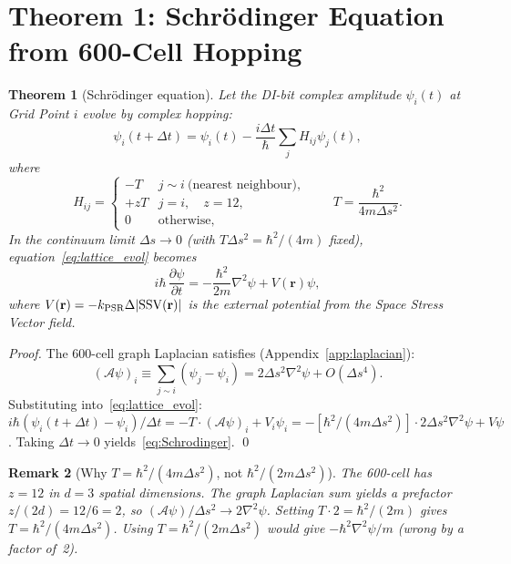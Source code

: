 \documentclass[11pt,a4paper]{article}
\newtheorem{theorem}{Theorem}[section]
\newtheorem{remark}[theorem]{Remark}
\newcommand{\SSV}{\mathrm{SSV}}
\begin{document}
\section{Theorem 1: Schr\"{o}dinger Equation from 600-Cell Hopping}

\begin{theorem}[Schr\"{o}dinger equation]
\label{thm:schrodinger}
Let the DI-bit complex amplitude $\psi_i(t)$ at Grid Point $i$ evolve
by complex hopping:
\begin{equation}
\psi_i(t+\Delta t) = \psi_i(t)
- \frac{i\Delta t}{\hbar}\sum_j H_{ij}\psi_j(t),
\label{eq:lattice_evol}
\end{equation}
where
\begin{equation}
H_{ij} = \begin{cases}
-T & j \sim i \ \text{(nearest neighbour)}, \\
+zT & j = i, \quad z = 12, \\
0 & \text{otherwise},
\end{cases}
\qquad T = \frac{\hbar^2}{4m\Delta s^2}.
\label{eq:H}
\end{equation}
In the continuum limit $\Delta s \to 0$ (with $T\Delta s^2 =
\hbar^2/(4m)$ fixed), equation~\eqref{eq:lattice_evol} becomes
\begin{equation}
i\hbar\,\frac{\partial\psi}{\partial t}
= -\frac{\hbar^2}{2m}\nabla^2\psi + V(\mathbf{r})\psi,
\label{eq:Schrodinger}
\end{equation}
where $V(\mathbf{r}) = -k_{\rm PSR}\Delta|\SSV(\mathbf{r})|$ is the
external potential from the Space Stress Vector field.
\end{theorem}

\begin{proof}
The 600-cell graph Laplacian satisfies (Appendix~\ref{app:laplacian}):
\begin{equation}
(\mathcal{A}\psi)_i \equiv \sum_{j\sim i}(\psi_j - \psi_i)
= 2\Delta s^2\nabla^2\psi + O(\Delta s^4).
\label{eq:laplacian}
\end{equation}
Substituting into~\eqref{eq:lattice_evol}:
$i\hbar(\psi_i(t+\Delta t) - \psi_i)/\Delta t = -T\cdot(\mathcal{A}\psi)_i
+ V_i\psi_i = -[\hbar^2/(4m\Delta s^2)]\cdot 2\Delta s^2\nabla^2\psi
+ V\psi$.
Taking $\Delta t \to 0$ yields~\eqref{eq:Schrodinger}. \qed
\end{proof}

\begin{remark}[Why $T = \hbar^2/(4m\Delta s^2)$, not $\hbar^2/(2m\Delta s^2)$]
The 600-cell has $z=12$ in $d=3$ spatial dimensions.
The graph Laplacian sum yields a prefactor $z/(2d) = 12/6 = 2$,
so $(\mathcal{A}\psi)/\Delta s^2 \to 2\nabla^2\psi$.
Setting $T\cdot 2 = \hbar^2/(2m)$ gives $T = \hbar^2/(4m\Delta s^2)$.
Using $T = \hbar^2/(2m\Delta s^2)$ would give $-\hbar^2\nabla^2\psi/m$
(wrong by a factor of~2).
\end{remark}
\end{document}
